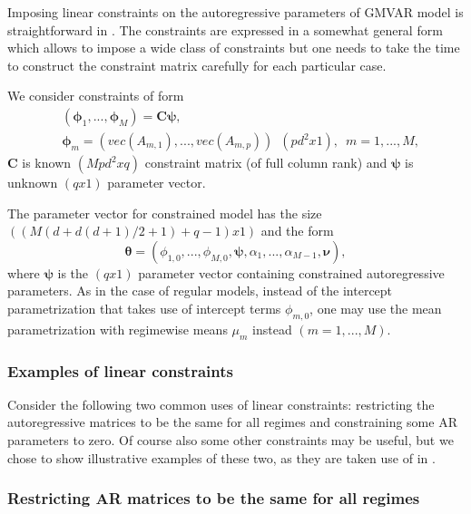 \documentclass[nojss]{jss}
\begin{document}
Imposing linear constraints on the autoregressive parameters of GMVAR model is straightforward in . The constraints are expressed in a somewhat general form which allows to impose a wide class of constraints but one needs to take the time to construct the constraint matrix carefully for each particular case.

We consider constraints of form
\begin{align}
& (\boldsymbol{\phi}_1,...,\boldsymbol{\phi}_M) = \boldsymbol{C}\boldsymbol{\psi},\\
& \boldsymbol{\phi}_m=(vec(A_{m,1}),...,vec(A_{m,p}))\enspace (pd^2x1), \enspace m=1,...,M,
\end{align}
$\boldsymbol{C}$ is known $(Mpd^2xq)$ constraint matrix (of full column rank) and $\boldsymbol{\psi}$ is unknown $(qx1)$ parameter vector.

The parameter vector for constrained model has the size $((M(d+d(d+1)/2+1)+q-1)x1)$ and the form
\begin{equation}
\boldsymbol{\theta} = (\phi_{1,0},...,\phi_{M,0},\boldsymbol{\psi},\alpha_1,...,\alpha_{M-1},\boldsymbol{\nu}),
\end{equation}
where $\boldsymbol{\psi}$ is the $(qx1)$ parameter vector containing constrained autoregressive parameters. As in the case of regular models, instead of the intercept parametrization that takes use of intercept terms $\phi_{m,0}$, one may use the mean parametrization with regimewise means $\mu_m$ instead $(m=1,...,M)$.

\subsubsection{Examples of linear constraints}

Consider the following two common uses of linear constraints: restricting the autoregressive matrices to be the same for all regimes and constraining some AR parameters to zero. Of course also some other constraints may be useful, but we chose to show illustrative examples of these two, as they are taken use of in \cite{Kalliovirta+Meitz+Saikkonen:2016}.

\subsubsection{Restricting AR matrices to be the same for all regimes}
\end{document}
